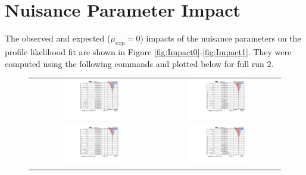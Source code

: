 \chapter{Nuisance Parameter Impact}
\label{chap:Impact}

The observed and expected ($\mu_{exp}=$0) impacts of the nuisance parameters on the profile likelihood fit are shown in Figure \ref{fig:Impact0}-\ref{fig:Impact1}. They were computed using the following commands and plotted below for full run 2.

 \begin{figure}[tbh!]
 \begin{center}
 \begin{tabular}{cc}
 \includegraphics[width=0.48\textwidth]{figures/Appendix/Impact/Impact_TensorU_expected0}&
  \includegraphics[width=0.48\textwidth]{figures/Appendix/Impact/Impact_TensorU}\\
   \includegraphics[width=0.48\textwidth]{figures/Appendix/Impact/Impact_VecU_expected0}&
  \includegraphics[width=0.48\textwidth]{figures/Appendix/Impact/Impact_VecU}\\

\end{tabular}
\end{center}
\end{figure}
